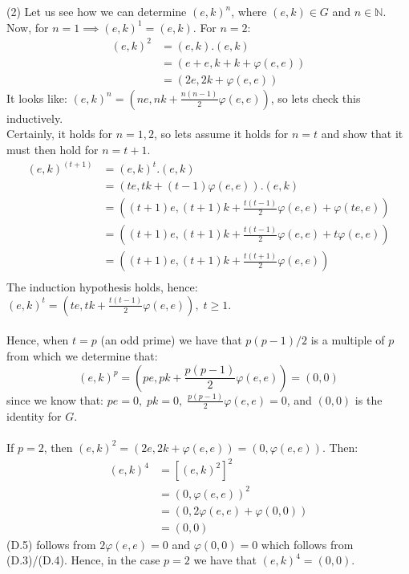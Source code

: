 \documentclass[12pt,a4paper]{article}
\begin{document}
\newpage
\noindent
(2) Let us see how we can determine $(e,k)^n$, where $(e,k) \in G$ and $n \in \mathbb{N}$.  Now, for $n=1 \implies (e,k)^1 = (e,k)$.  For $n=2$:
\begin{align*}
  (e,k)^2 &= (e,k).(e,k) \\
  &= (e+e, k+k+\varphi(e,e)) \\
  &= (2e, 2k+\varphi(e,e))
\end{align*}
It looks like: $(e,k)^n = (ne, nk + \frac{n(n-1)}{2}\varphi(e,e))$, so lets check this inductively.\\
Certainly, it holds for $n=1,2$, so lets assume it holds for $n=t$ and show that it must then hold for $n=t+1$.
\begin{align*}
  (e,k)^{(t+1)} &= (e,k)^t.(e,k) \\
  &= (te, tk+ (t-1)\varphi(e,e)).(e,k) \\
  &= ((t+1)e, (t+1)k+ \frac{t(t-1)}{2}\varphi(e,e) + \varphi(te,e)) \\
  &= ((t+1)e, (t+1)k+ \frac{t(t-1)}{2}\varphi(e,e) + t\varphi(e,e)) \\
  &= ((t+1)e, (t+1)k+ \frac{t(t+1)}{2}\varphi(e,e)) \\
\end{align*}
The induction hypothesis holds, hence: $(e,k)^{t} = (te, tk+ \frac{t(t-1)}{2}\varphi(e,e)), \; t \ge 1$.\\
\\
Hence, when $t=p$ (an odd prime) we have that $p(p-1)/2$ is a multiple of $p$ from which we determine that:
$$(e,k)^p = (pe,pk + \frac{p(p-1)}{2}\varphi(e,e)) = (0,0)$$
since we know that: $pe=0, \; pk=0, \; \frac{p(p-1)}{2}\varphi(e,e)=0$, and $(0,0)$ is the identity for $G$.\\
\\
If $p=2$, then $(e,k)^2 = (2e, 2k + \varphi(e,e)) = (0,\varphi(e,e))$.  Then:
\begin{align*}
  (e,k)^4 &= [(e,k)^2]^2 \\
  &= (0,\varphi(e,e))^2 \\
  &= (0,2 \varphi(e,e) + \varphi(0,0)) \\
  &= (0,0) \tag{D.5}
\end{align*}
(D.5) follows from $2 \varphi(e,e)=0$ and $\varphi(0,0)=0$ which follows from (D.3)/(D.4).
Hence, in the case $p=2$ we have that $(e,k)^4 = (0,0)$.\\
\\
\end{document}
